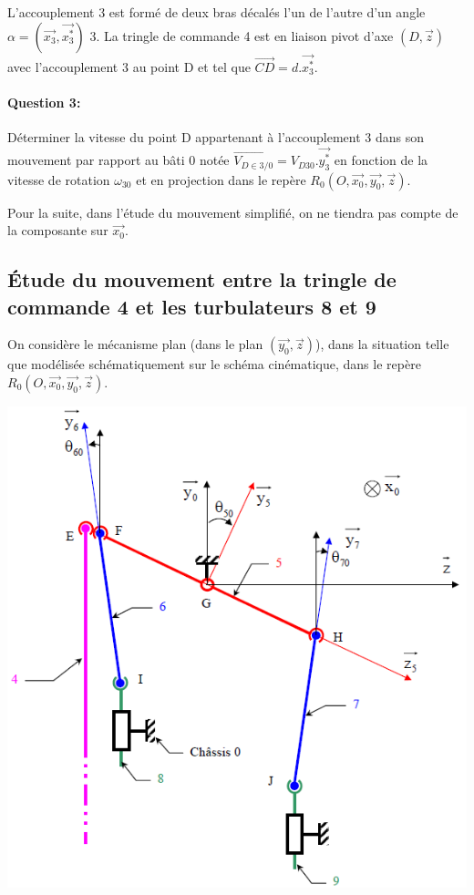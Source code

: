 L'accouplement 3 est formé de deux bras décalés l'un de l'autre d'un angle $\alpha=(\overrightarrow{x_3},\overrightarrow{x^*_3})$
3. La tringle de commande 4 est en liaison pivot d'axe $(D,\overrightarrow{z})$ avec l'accouplement 3 au point D et tel que $\overrightarrow{CD}=d.\overrightarrow{x^*_3}$.

\paragraph{Question 3:} Déterminer la vitesse du point D appartenant à l'accouplement 3 dans son mouvement par rapport au bâti 0 notée $\overrightarrow{V_{D\in 3/0}}=V_{D30}.\overrightarrow{y^*_3}$ en fonction de la vitesse de rotation $\omega_{30}$ et en projection dans le repère $R_0(O,\overrightarrow{x_0},\overrightarrow{y_0},\overrightarrow{z})$.

Pour la suite, dans l'étude du mouvement simplifié, on ne tiendra pas compte de la composante sur $\overrightarrow{x_0}$.

\subsection{Étude du mouvement entre la tringle de commande 4 et les turbulateurs 8 et 9}

On considère le mécanisme plan (dans le plan $(\overrightarrow{y_0},\overrightarrow{z})$), dans la situation telle que modélisée schématiquement sur le schéma cinématique, dans le repère $R_0(O,\overrightarrow{x_0},\overrightarrow{y_0},\overrightarrow{z})$.

\begin{center}
	\includegraphics[width=0.7\linewidth]{img/Chaudiere_cinematique_2}
\end{center}

